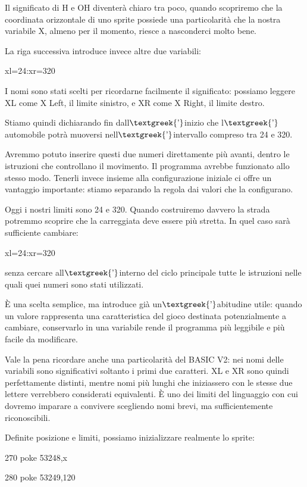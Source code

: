 \documentclass{article}
\begin{document}
Il significato di H e OH diventerà chiaro tra poco, quando scopriremo che la coordinata orizzontale di uno sprite
possiede una particolarità che la nostra variabile X, almeno per il momento, riesce a nasconderci molto bene.

La riga successiva introduce invece altre due variabili:

xl=24:xr=320

I nomi sono stati scelti per ricordarne facilmente il significato: possiamo leggere XL come X Left, il limite sinistro,
e XR come X Right, il limite destro.

Stiamo quindi dichiarando fin dall$\text{\textgreek{’}}$inizio che l$\text{\textgreek{’}}$automobile potrà muoversi
nell$\text{\textgreek{’}}$intervallo compreso tra 24 e 320.

Avremmo potuto inserire questi due numeri direttamente più avanti, dentro le istruzioni che controllano il movimento. Il
programma avrebbe funzionato allo stesso modo. Tenerli invece insieme alla configurazione iniziale ci offre un
vantaggio importante: stiamo separando la regola dai valori che la configurano.

Oggi i nostri limiti sono 24 e 320. Quando costruiremo davvero la strada potremmo scoprire che la carreggiata deve
essere più stretta. In quel caso sarà sufficiente cambiare:

xl=24:xr=320

senza cercare all$\text{\textgreek{’}}$interno del ciclo principale tutte le istruzioni nelle quali quei numeri sono
stati utilizzati.

È una scelta semplice, ma introduce già un$\text{\textgreek{’}}$abitudine utile: quando un valore rappresenta una
caratteristica del gioco destinata potenzialmente a cambiare, conservarlo in una variabile rende il programma più
leggibile e più facile da modificare.

Vale la pena ricordare anche una particolarità del BASIC V2: nei nomi delle variabili sono significativi soltanto i
primi due caratteri. XL e XR sono quindi perfettamente distinti, mentre nomi più lunghi che iniziassero con le stesse
due lettere verrebbero considerati equivalenti. È uno dei limiti del linguaggio con cui dovremo imparare a convivere
scegliendo nomi brevi, ma sufficientemente riconoscibili.

Definite posizione e limiti, possiamo inizializzare realmente lo sprite:

270 poke 53248,x

280 poke 53249,120
\end{document}
